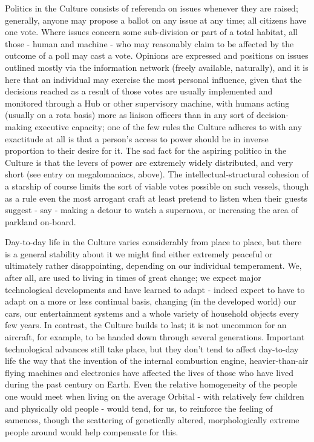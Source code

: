 Politics in the Culture consists of referenda on issues whenever they are raised; generally, anyone may propose a ballot on any issue at any time; all citizens have one vote. Where issues concern some sub-division or part of a total habitat, all those - human and machine - who may reasonably claim to be affected by the outcome of a poll may cast a vote. Opinions are expressed and positions on issues outlined mostly via the information network (freely available, naturally), and it is here that an individual may exercise the most personal influence, given that the decisions reached as a result of those votes are usually implemented and monitored through a Hub or other supervisory machine, with humans acting (usually on a rota basis) more as liaison officers than in any sort of decision-making executive capacity; one of the few rules the Culture adheres to with any exactitude at all is that a person's access to power should be in inverse proportion to their desire for it. The sad fact for the aspiring politico in the Culture is that the levers of power are extremely widely distributed, and very short (see entry on megalomaniacs, above). The intellectual-structural cohesion of a starship of course limits the sort of viable votes possible on such vessels, though as a rule even the most arrogant craft at least pretend to listen when their guests suggest - say - making a detour to watch a supernova, or increasing the area of parkland on-board.

Day-to-day life in the Culture varies considerably from place to place, but there is a general stability about it we might find either extremely peaceful or ultimately rather disappointing, depending on our individual temperament. We, after all, are used to living in times of great change; we expect major technological developments and have learned to adapt - indeed expect to have to adapt on a more or less continual basis, changing (in the developed world) our cars, our entertainment systems and a whole variety of household objects every few years. In contrast, the Culture builds to last; it is not uncommon for an aircraft, for example, to be handed down through several generations. Important technological advances still take place, but they don't tend to affect day-to-day life the way that the invention of the internal combustion engine, heavier-than-air flying machines and electronics have affected the lives of those who have lived during the past century on Earth. Even the relative homogeneity of the people one would meet when living on the average Orbital - with relatively few children and physically old people - would tend, for us, to reinforce the feeling of sameness, though the scattering of genetically altered, morphologically extreme people around would help compensate for this.

